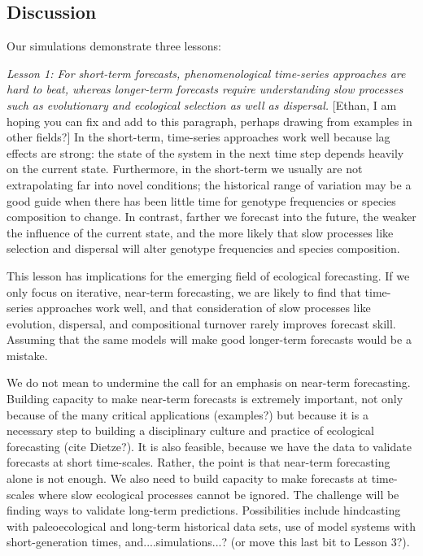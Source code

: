 \documentclass[11pt]{article}
\begin{document}
\subsection*{Discussion}

Our simulations demonstrate three lessons:

\emph{Lesson 1: For short-term forecasts, phenomenological time-series approaches are hard to beat, whereas longer-term forecasts require understanding slow 
processes such as evolutionary and ecological selection as well as dispersal.} [Ethan, I am hoping you can fix and add to this paragraph, perhaps
drawing from examples in other fields?] In the short-term, time-series approaches work well because lag effects are strong: the state of the system in the next 
time step depends heavily on the current state. Furthermore, in the short-term we usually are not extrapolating far into novel conditions; the historical range of variation 
may be a good guide when there has been little time for genotype frequencies or species composition to change. In contrast, farther we forecast into the future, 
the weaker the influence of the current state, and the more likely that slow processes like selection and dispersal will alter genotype frequencies and
species composition.
		
This lesson has implications for the emerging field of ecological forecasting. If we only focus on iterative, near-term forecasting, we are likely to find 
that time-series approaches work well, and that consideration of slow processes like evolution, dispersal, and compositional turnover rarely improves
forecast skill. Assuming that the same models will make good longer-term forecasts would be a mistake.

We do not mean to undermine the call for an emphasis on near-term forecasting. Building capacity to make near-term forecasts is extremely important, not
only because of the many critical applications (examples?) but because it is a necessary step to building a disciplinary culture and practice of ecological 
forecasting (cite Dietze?). It is also feasible, because we have the data to validate forecasts at short time-scales. Rather, the point is that near-term forecasting
alone is not enough. We also need to build capacity to make forecasts at time-scales where slow ecological processes cannot be ignored. The challenge 
will be finding ways to validate long-term predictions. Possibilities include hindcasting with paleoecological and long-term historical data sets, use of model
systems with short-generation times, and....simulations...? (or move this last bit to Lesson 3?).
\end{document}
